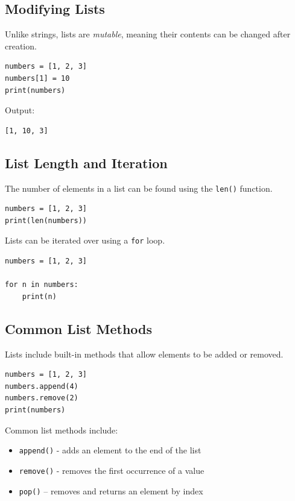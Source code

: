 \subsection{Modifying Lists}

Unlike strings, lists are \emph{mutable}, meaning their contents can be changed
after creation.

\begin{verbatim}
numbers = [1, 2, 3]
numbers[1] = 10
print(numbers)
\end{verbatim}

Output:
\begin{verbatim}
[1, 10, 3]
\end{verbatim}

\subsection{List Length and Iteration}

The number of elements in a list can be found using the \texttt{len()} function.

\begin{verbatim}
numbers = [1, 2, 3]
print(len(numbers))
\end{verbatim}

Lists can be iterated over using a \texttt{for} loop.

\begin{verbatim}
numbers = [1, 2, 3]

for n in numbers:
    print(n)
\end{verbatim}

\subsection{Common List Methods}

Lists include built-in methods that allow elements to be added or removed.

\begin{verbatim}
numbers = [1, 2, 3]
numbers.append(4)
numbers.remove(2)
print(numbers)
\end{verbatim}

Common list methods include:
\begin{itemize}
    \item \texttt{append()} - adds an element to the end of the list
    \item \texttt{remove()} - removes the first occurrence of a value
    \item \texttt{pop()} – removes and returns an element by index
\end{itemize}

